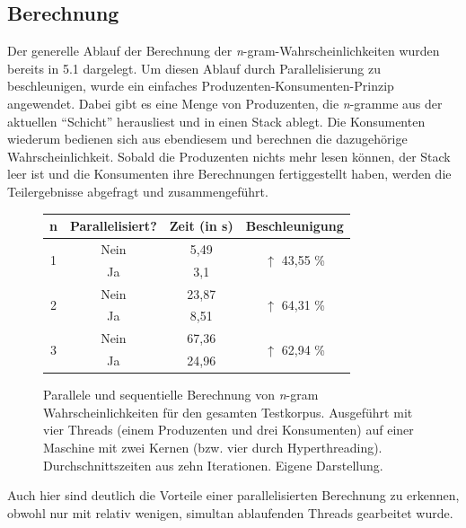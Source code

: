 \documentclass[a4paper,12pt]{scrartcl}
\begin{document}
    \subsection{Berechnung}

    Der generelle Ablauf der Berechnung der \emph{n}-gram-Wahrscheinlichkeiten wurden bereits in 5.1 dargelegt. Um diesen Ablauf durch Parallelisierung zu beschleunigen, wurde ein einfaches Produzenten-Konsumenten-Prinzip angewendet. Dabei gibt es eine Menge von Produzenten, die \emph{n}-gramme aus der aktuellen ``Schicht'' herausliest und in einen Stack ablegt. Die Konsumenten wiederum bedienen sich aus ebendiesem und berechnen die dazugehörige Wahrscheinlichkeit. Sobald die Produzenten nichts mehr lesen können, der Stack leer ist und die Konsumenten ihre Berechnungen fertiggestellt haben, werden die Teilergebnisse abgefragt und zusammengeführt. \\

    \begin{figure}[h]
        \centering
        \begin{tabular}{c|c||c|c}
            n & Parallelisiert? & Zeit (in s) & Beschleunigung\\
            \hline \hline
            \multirow{2}{*}{1} & \textcolor{BrickRed}{Nein} & 5,49 & \multirow{2}{*}{\textcolor{OliveGreen}{$\uparrow$ 43,55 \%}}  \\
             & \textcolor{OliveGreen}{Ja} & 3,1 & \\
            \hline
            \multirow{2}{*}{2} & \textcolor{BrickRed}{Nein} & 23,87 & \multirow{2}{*}{\textcolor{OliveGreen}{$\uparrow$ 64,31 \%}} \\
             & \textcolor{OliveGreen}{Ja} & 8,51 & \\
            \hline
            \multirow{2}{*}{3} & \textcolor{BrickRed}{Nein} & 67,36 & \multirow{2}{*}{\textcolor{OliveGreen}{$\uparrow$ 62,94 \%}} \\
             & \textcolor{OliveGreen}{Ja} & 24,96 & \\
        \end{tabular}
        \caption{Parallele und sequentielle Berechnung von \emph{n}-gram Wahrscheinlichkeiten für den gesamten Testkorpus. Ausgeführt mit vier Threads (einem Produzenten und drei Konsumenten) auf einer Maschine mit zwei Kernen (bzw. vier durch Hyperthreading). Durchschnittszeiten aus zehn Iterationen. Eigene Darstellung.}
    \end{figure}

    Auch hier sind deutlich die Vorteile einer parallelisierten Berechnung zu erkennen, obwohl nur mit relativ wenigen, simultan ablaufenden Threads gearbeitet wurde. 
\end{document}

